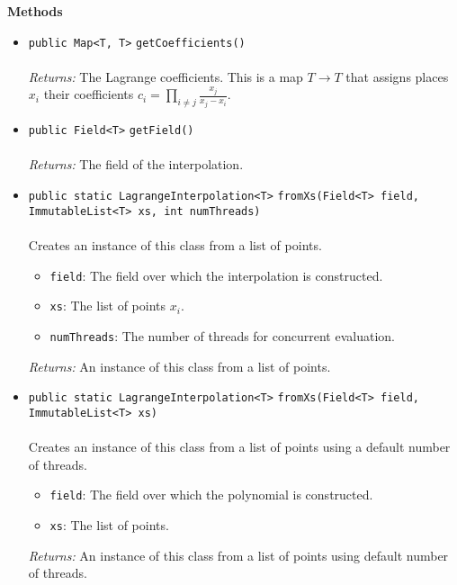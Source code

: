 \textbf{\sffamily Methods}
\begin{itemize}
\item \lstinline|public Map<T, T>| \lstinline|getCoefficients|\lstinline|()|\\ \\[-0.6em]
\emph{Returns:} The Lagrange coefficients. This is a map $T \to T$ that assigns places $x_i$
 their coefficients
 $c_i = \prod_{i \neq j} \frac{x_j}{x_j - x_i}$.



\item \lstinline|public Field<T>| \lstinline|getField|\lstinline|()|\\ \\[-0.6em]
\emph{Returns:} The field of the interpolation.



\item \lstinline|public static LagrangeInterpolation<T>| \lstinline|fromXs|\lstinline|(Field<T> field, ImmutableList<T> xs, int numThreads)|\\ \\[-0.6em]
Creates an instance of this class from a list of points.
\begin{itemize}
\item \lstinline|field|: The field over which the interpolation is constructed.
\item \lstinline|xs|: The list of points $x_i$.
\item \lstinline|numThreads|: The number of threads for concurrent evaluation.
\end{itemize}

\emph{Returns:} An instance of this class from a list of points.

\item \lstinline|public static LagrangeInterpolation<T>| \lstinline|fromXs|\lstinline|(Field<T> field, ImmutableList<T> xs)|\\ \\[-0.6em]
Creates an instance of this class from a list of points using a default number of threads.
\begin{itemize}
\item \lstinline|field|: The field over which the polynomial is constructed.
\item \lstinline|xs|: The list of points.
\end{itemize}

\emph{Returns:} An instance of this class from a list of points using default number of threads.


\end{itemize}
